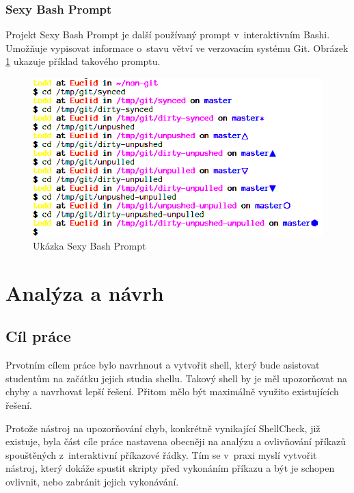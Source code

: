 \documentclass[thesis=M,czech]{FITthesis}[2012/06/26]
\begin{document}

\subsection{Sexy Bash Prompt}

Projekt Sexy Bash Prompt \cite{sexybashprompt} je další používaný prompt v~interaktivním Bashi. Umožňuje vypisovat informace o~stavu větví ve verzovacím systému Git. Obrázek \ref{fig:sexy_prompt} ukazuje příklad takového promptu.

\begin{figure}[htb]\centering
	\includegraphics[width=\textwidth]{./images/sexy_prompt_edited}
	\caption{Ukázka Sexy Bash Prompt \cite{sexybashprompt}}
	\label{fig:sexy_prompt}
\end{figure}




%
%
%
\chapter{Analýza a návrh}

%
%
%
\section{Cíl práce}

Prvotním cílem práce bylo navrhnout a vytvořit shell, který bude asistovat studentům na začátku jejich studia shellu. Takový shell by je měl upozorňovat na chyby a navrhovat lepší řešení. Přitom mělo být maximálně využito existujících řešení.

Protože nástroj na upozorňování chyb, konkrétně vynikající ShellCheck, již existuje, byla část cíle práce nastavena obecněji na analýzu a ovlivňování příkazů spouštěných z~interaktivní příkazové řádky. Tím se v~praxi myslí vytvořit nástroj, který dokáže spustit skripty před vykonáním příkazu a být je schopen ovlivnit, nebo zabránit jejich vykonávání.
\end{document}
